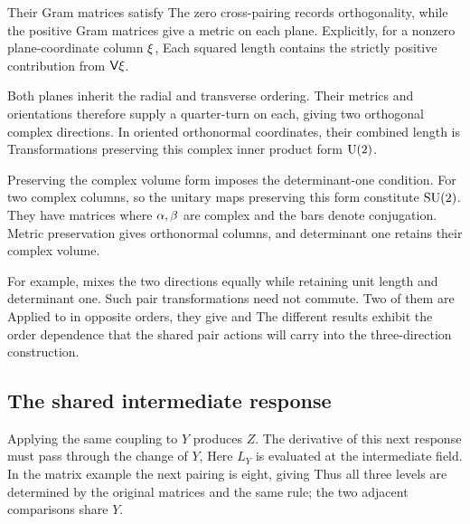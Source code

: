 Their Gram matrices satisfy
\CouplingPairGramDisplay
The zero cross-pairing records orthogonality, while the positive Gram matrices give a metric on each plane. Explicitly, for a nonzero plane-coordinate column $\xi$,
\CouplingGramLengthsDisplay
Each squared length contains the strictly positive contribution from ${\mathsf V}\xi$.

Both planes inherit the radial and transverse ordering. Their metrics and orientations therefore supply a quarter-turn on each, giving two orthogonal complex directions. In oriented orthonormal coordinates,
\FieldCouplingComplexPairDisplay
their combined length is
\FieldCouplingComplexNormDisplay
Transformations preserving this complex inner product form $\mathrm U(2)$.

Preserving the complex volume form imposes the determinant-one condition. For two complex columns,
\CouplingComplexVolumeDisplay
so the unitary maps preserving this form constitute $\mathrm{SU}(2)$. They have matrices
\CouplingPairGroupDisplay
where $\alpha,\beta$ are complex and the bars denote conjugation. Metric preservation gives orthonormal columns, and determinant one retains their complex volume.

For example,
\CouplingUnitaryMixingExampleDisplay
mixes the two directions equally while retaining unit length and determinant one. Such pair transformations need not commute. Two of them are
\FieldCouplingMixingMatricesDisplay
Applied to
\FieldCouplingInitialCoordinateDisplay
in opposite orders, they give
\FieldCouplingFirstOrderDisplay
and
\FieldCouplingSecondOrderDisplay
The different results exhibit the order dependence that the shared pair actions will carry into the three-direction construction.

\subsection{The shared intermediate response}
Applying the same coupling to $Y$ produces $Z$. The derivative of this next response must pass through the change of $Y$,
\CouplingSuccessiveResponseDisplay
Here $L_Y$ is evaluated at the intermediate field. In the matrix example the next pairing is eight, giving
\CouplingSecondMatrixResponseDisplay
Thus all three levels are determined by the original matrices and the same rule; the two adjacent comparisons share $Y$.

